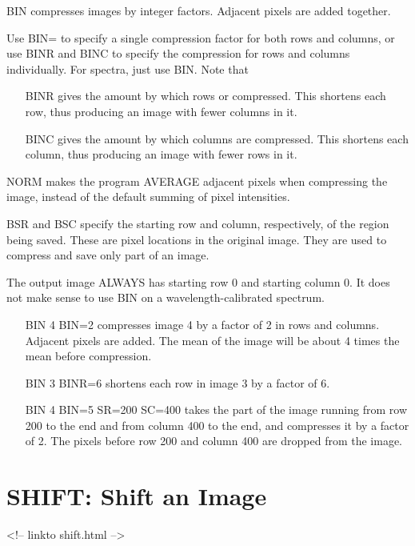 BIN compresses images by integer factors.  Adjacent pixels are added
together.

Use BIN= to specify a single compression factor for both rows and columns,
or use BINR and BINC to specify the compression for rows and columns
individually.  For spectra, just use BIN.  Note that
\begin{itemize}
  \item[BINR\hfill]{gives the amount by which rows or compressed.  This
       shortens each row, thus producing an image with
       fewer columns in it.}
  \item[BINC\hfill]{gives the amount by which columns are compressed.
       This shortens each column, thus producing an image
       with fewer rows in it.}
\end{itemize}

NORM makes the program AVERAGE adjacent pixels when compressing the image,
instead of the default summing of pixel intensities.

BSR and BSC specify the starting row and column, respectively, of the
region being saved.  These are pixel locations in the original image.  They
are used to compress and save only part of an image.

The output image ALWAYS has starting row 0 and starting column 0.  It does
not make sense to use BIN on a wavelength-calibrated spectrum.

\begin{itemize}
  \item[BIN 4 BIN=2\hfill]{compresses image 4 by a factor of 2
       in rows and columns.  Adjacent pixels
       are added.  The mean of the image will
       be about 4 times the mean before
       compression.}
  \item[BIN 3 BINR=6\hfill]{shortens each row in image 3 by a 
       factor of 6.}
  \item[BIN 4 BIN=5 SR=200 SC=400\hfill]{
       takes the part of the image running 
       from row 200 to the end and from
       column 400 to the end, and compresses
       it by a factor of 2.  The pixels 
       before row 200 and column 400 are
       dropped from the image.}
\end{itemize}

\section{SHIFT: Shift an Image}
\begin{rawhtml}
<!-- linkto shift.html -->
\end{rawhtml}

